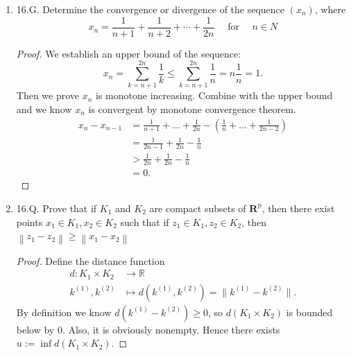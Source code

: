 \begin{enumerate}
\begin{proof}
	The proof for the case that $y_n < s$ infinitely often is entirely symmetrical. 

	Justification of claim 2: Since $X$ is unbounded from above, for each $M$, there exists $N$ such that for all $n > N$, we have  $x_n > M$. Therefore, we can define a subsequence $x_{n_j}$ such that \[
		n_j := \operatorname{inf} 
		\{m \in \mathbb{N}: m > n_{j-1}, x_m > x_{n_{j-1}}\} 
	.\] 
	To verify that the definition is well-posed, assume inductively that $n_j$ is well-defined up to $j = p$. Now there exists $N$ such that for all $m >  N$, we have $x_m > x_{n_{p}}$. Then $\max(n_{j-1}, N)+1 \in \{m \in \mathbb{N}: m > n_{j-1}, x_m > x_{n_{j-1}}\}$. Thus by well-orderedness of natural numbers $n_{j}$ is well-defined for $j = p+1$.

	By definition, $x_{n_j}$ is monotone increasing and is a subsequence of $X$.
\end{proof}

	\item 16.G. Determine the convergence or divergence of the sequence $\left(x_n\right)$, where
\[
x_n=\frac{1}{n+1}+\frac{1}{n+2}+\cdots+\frac{1}{2 n} \quad \text { for } \quad n \in N
\]
\begin{proof}
	We establish an upper bound of the sequence:
	\[
		 x_n = \sum_{k=n+1}^{2n} \frac{1}{k}
		 \le  \sum_{k=n+1}^{2n} \frac{1}{n}
		 = n \frac{1}{n} = 1
	.\] 
	Then we prove $x_n$ is monotone increasing. Combine with the upper bound and we know $x_n$ is convergent by monotone convergence theorem.
	\begin{align*}
		x_n - x_{n-1 }&= \frac{1}{n+1} + \ldots + \frac{1}{2n} - \left( \frac{1}{n} + \ldots + \frac{1}{2n-2} \right)  \\
			      &= \frac{1}{2n-1} + \frac{1}{2n} - \frac{1}{n} \\
			      &> \frac{1}{2n} + \frac{1}{2n} - \frac{1}{n} \\
			      &= 0
	.\end{align*} 
\end{proof}

	\item 16.Q. Prove that if $K_1$ and $K_2$ are compact subsets of $\boldsymbol{R}^{\mathrm{p}}$, then there exist points $x_1 \in K_1, x_2 \in K_2$ such that if $z_1 \in K_1, z_2 \in K_2$, then $\left\|z_1-z_2\right\| \geq\left\|x_1-x_2\right\|$
\begin{proof}
	Define the distance function
		\begin{align*}
			d: K_1 \times K_2 &\longrightarrow \mathbb{R} \\
			k^{(1)}, k^{(2)} &\longmapsto d(k^{(1)}, k^{(2)}) = \|k^{(1)}- k^{(2)}\|
		.\end{align*}
		By definition we know $d(k^{(1)}- k^{(2)}) \ge 0$, so $d(K_1 \times K_2)$ is bounded below by $0$. Also, it is obviously nonempty. Hence there exists $u := \operatorname{inf} d(K_1\times K_2)$.


\end{proof}
\end{enumerate}
